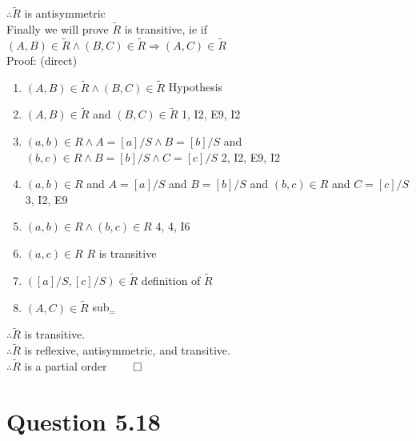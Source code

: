 \documentclass{article}
\begin{document}
			$\therefore \widetilde{R}$ is antisymmetric \\
			Finally we will prove $\widetilde{R}$ is transitive, ie if $(A, B) \in \widetilde{R} \land (B, C) \in \widetilde{R} \Rightarrow (A, C) \in \widetilde{R}$ \\
			Proof: (direct)
			\begin{enumerate}
				\item $(A, B) \in \widetilde{R} \land (B, C) \in \widetilde{R}$ \hfill Hypothesis
				\item $(A, B) \in \widetilde{R}$ and $(B, C) \in \widetilde{R}$ \hfill 1, I2, E9, I2
				\item $(a, b) \in R \land A = [a]/S \land B = [b]/S$ and $(b, c) \in R \land B = [b]/S \land C = [c]/S$ \hfill 2, I2, E9, I2
				\item $(a, b) \in R$ and $A = [a]/S$ and $B = [b]/S$ and $(b, c) \in R$ and $C = [c]/S$ \hfill 3, I2, E9
				\item $(a, b) \in R \land (b, c) \in R$ \hfill 4, 4, I6
				\item $(a, c) \in R$ \hfill $R$ is transitive
				\item $([a]/S, [c]/S) \in \widetilde{R}$ \hfill definition of $\widetilde{R}$
				\item $(A, C) \in \widetilde{R}$ \hfill sub$_{=}$
			\end{enumerate}
			$\therefore \widetilde{R}$ is transitive. \\
			$\therefore \widetilde{R}$ is reflexive, antisymmetric, and transitive. \\
			$\therefore \widetilde{R}$ is a partial order \hfill $\qed$
	\section{Question 5.18}
\end{document}
